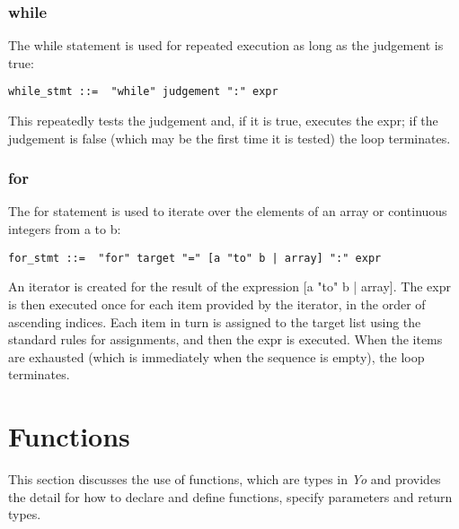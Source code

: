 \documentclass[12pt]{article}
\begin{document}
\subsubsection{while} %
The while statement is used for repeated execution as long as the judgement is true:
\begin{lstlisting}[caption=while]
while_stmt ::=  "while" judgement ":" expr
\end{lstlisting}
This repeatedly tests the judgement and, if it is true, executes the expr; if the judgement is false (which may be the first time it is tested) the loop terminates.\\

\subsubsection{for} %
The for statement is used to iterate over the elements of an array or continuous integers from a to b:
\begin{lstlisting}[caption=for]
 for_stmt ::=  "for" target "=" [a "to" b | array] ":" expr

\end{lstlisting}
An iterator is created for the result of the expression [a "to" b | array]. The expr is then executed once for each item provided by the iterator, in the order of ascending indices. Each item in turn is assigned to the target list using the standard rules for assignments, and then the expr is executed. When the items are exhausted (which is immediately when the sequence is empty), the loop terminates.

\section{Functions} %
\label{sec:function}
This section discusses the use of functions, which are types in \textit{Yo} and provides the detail for how to declare and define functions, specify parameters and return types. 
\end{document}
